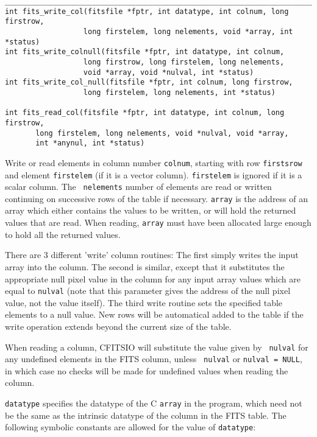 \documentclass[11pt]{article}
\begin{document}
\begin{verbatim}
__________________________________________________________________________
int fits_write_col(fitsfile *fptr, int datatype, int colnum, long firstrow,
                  long firstelem, long nelements, void *array, int *status)
int fits_write_colnull(fitsfile *fptr, int datatype, int colnum, 
                  long firstrow, long firstelem, long nelements, 
                  void *array, void *nulval, int *status)
int fits_write_col_null(fitsfile *fptr, int colnum, long firstrow,
                  long firstelem, long nelements, int *status)

int fits_read_col(fitsfile *fptr, int datatype, int colnum, long firstrow,
       long firstelem, long nelements, void *nulval, void *array, 
       int *anynul, int *status)

\end{verbatim}

Write or read elements in column number {\tt colnum}, starting with row
{\tt firstsrow} and element {\tt firstelem} (if it is a vector
column).  {\tt firstelem} is ignored if it is a scalar column. The {\tt
nelements} number of elements are read or written continuing on
successive rows of the table if necessary. {\tt array} is the address
of an array which either contains the  values to be written, or will
hold the returned values that are read.  When reading, {\tt array} must
have been allocated large enough to hold all the returned values.

There are 3 different 'write' column routines:  The first simply writes
the input array into the column.  The second is similar, except that it
substitutes the appropriate null pixel value in the column for any
input array values which are equal to {\tt *nulval} (note that this
parameter gives the address of the null pixel value, not the value
itself).  The third write routine sets the specified table elements
to a null value.  New rows will be automatical added to the table
if the write operation extends beyond the current size of the table.

When reading a column, CFITSIO will substitute the value given by {\tt
nulval}  for  any undefined elements in the FITS column, unless {\tt
nulval} or {\tt *nulval = NULL}, in which case no checks will be made
for undefined values when reading the column.

{\tt datatype} specifies the datatype of the C {\tt array} in the program,
which need not be the same as the intrinsic datatype of the column in
the FITS table.   The following symbolic constants are allowed for the
value of {\tt datatype}:
\end{document}
